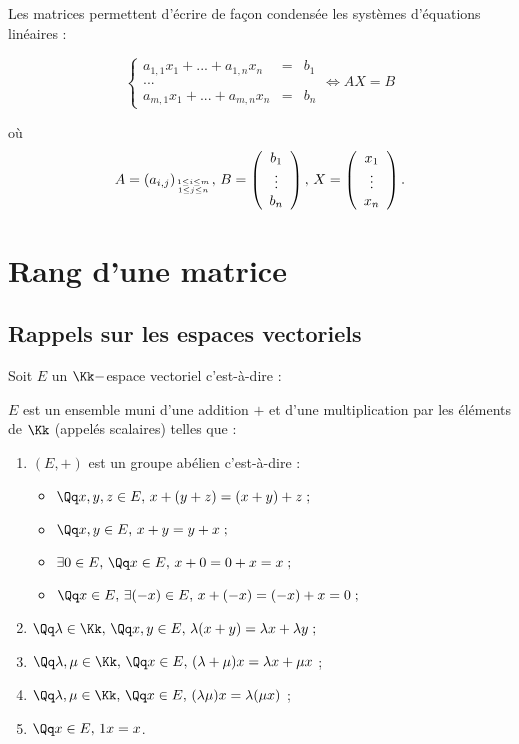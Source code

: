 \documentclass[class=report,crop=false]{standalone}
\begin{document}
Les matrices permettent d'écrire de fa\c{c}on condensée les systèmes d'équations linéaires :

\[\left\{\begin{array}{ccc}
a_{1,1}x_1 + ... + a_{1,n}x_n & = & b_1\\
... && \\
a_{m,1}x_1 + ... + a_{m,n}x_n & = & b_n
\end{array}\right. \iff AX = B \]

où \[A = (a_{i,j})_{1 \le i\le m \atop 1 \le j \le n}, \, B=\left(\begin{array}{c}
b_1 \\
\vdots \\
b_n
\end{array}\right) ,\, X= \left(\begin{array}{c}
x_1 \\
\vdots \\
x_n
\end{array}\right) .\]


\section{Rang d'une matrice}


\subsection{Rappels sur les espaces vectoriels}

Soit $E$ un $\Kk-$espace vectoriel c'est-à-dire :

$E$ est un ensemble muni d'une addition $+$ et d'une multiplication par les éléments de $\Kk$ (appelés scalaires) telles que :

\begin{enumerate}
\item $(E,+)$ est un groupe abélien c'est-à-dire :

\begin{itemize}
\item $\Qq x,y,z \in E,\, x+ (y +z) = (x+y) +z \; ;$
\item $\Qq x,y \in E,\, x + y = y +x \; ;$
\item $ \exists 0 \in E,\, \Qq x \in E, \, x+ 0 = 0 + x = x \; ;$
\item $  \Qq x \in E,\, \exists (-x) \in E ,\, x + (-x) = (-x) + x = 0 \; ; $
\end{itemize} 

\item $\Qq \lambda \in \Kk, \, \Qq x,y \in E,\, \lambda(x+y) = \lambda x + \lambda y \;;$
\item $\Qq \lambda,\mu \in \Kk,\, \Qq x \in E,\, (\lambda + \mu)x = \lambda x + \mu x $ ;
\item $\Qq \lambda,\mu \in \Kk,\, \Qq x \in E,\, (\lambda\mu ) x = \lambda (\mu x)$ ;
\item $\Qq x \in E, \, 1x = x$. 
\end{enumerate}
\end{document}
